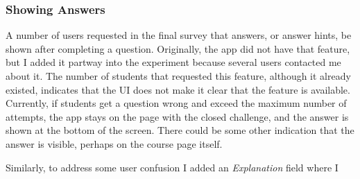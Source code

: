 \subsubsection{Showing Answers}

\par A number of users requested in the final survey that answers, or answer hints, be shown after completing a question. Originally, the app did not have that feature, but I added it partway into the experiment because several users contacted me about it. The number of students that requested this feature, although it already existed, indicates that the UI does not make it clear that the feature is available. Currently, if students get a question wrong and exceed the maximum number of attempts, the app stays on the page with the closed challenge, and the answer is shown at the bottom of the screen. There could be some other indication that the answer is visible, perhaps on the course page itself.

\par Similarly, to address some user confusion I added an \textit{Explanation} field where I 